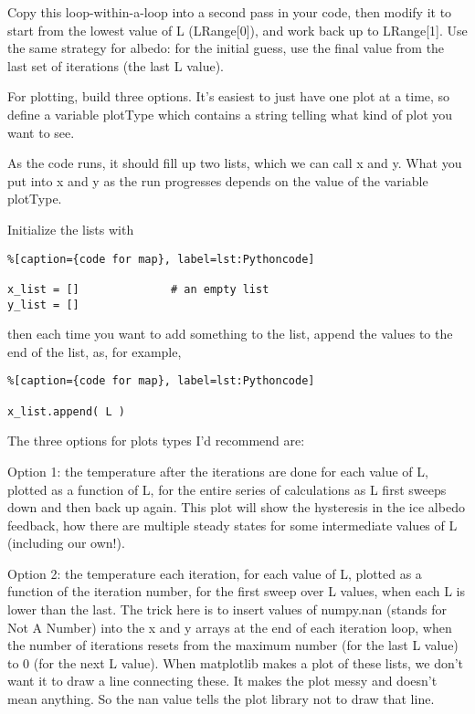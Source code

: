 Copy this loop-within-a-loop into a second pass in your code, then modify it to start from the lowest value of L (LRange[0]), and work back up to LRange[1]. Use the same strategy for albedo: for the initial guess, use the final value from the last set of iterations (the last L value).

For plotting, build three options. It's easiest to just have one plot at a time, so define a variable plotType which contains a string telling what kind of plot you want to see.

As the code runs, it should fill up two lists, which we can call x and y. What you put into x and y as the run progresses depends on the value of the variable plotType.

Initialize the lists with

\begin{lstlisting}%[caption={code for map}, label=lst:Pythoncode]

x_list = []              # an empty list
y_list = []
\end{lstlisting}

then each time you want to add something to the list, append the values to the end of the list, as, for example,

\begin{lstlisting}%[caption={code for map}, label=lst:Pythoncode]

x_list.append( L )
\end{lstlisting}

The three options for plots types I'd recommend are:

Option 1: the temperature after the iterations are done for each value of L, plotted as a function of L, for the entire series of calculations as L first sweeps down and then back up again. This plot will show the hysteresis in the ice albedo feedback, how there are multiple steady states for some intermediate values of L (including our own!).

Option 2: the temperature each iteration, for each value of L, plotted as a function of the iteration number, for the first sweep over L values, when each L is lower than the last. The trick here is to insert values of numpy.nan (stands for Not A Number) into the x and y arrays at the end of each iteration loop, when the number of iterations resets from the maximum number (for the last L value) to 0 (for the next L value). When matplotlib makes a plot of these lists, we don't want it to draw a line connecting these. It makes the plot messy and doesn't mean anything. So the nan value tells the plot library not to draw that line.

